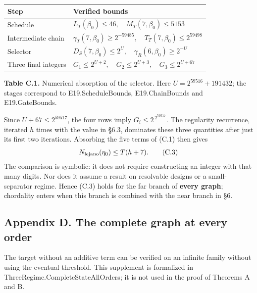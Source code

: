 \documentclass[english,11pt,a4paper]{article}
\newcounter{none}
\begin{document}

{\def\LTcaptype{none} %
\begin{longtable}[c]{@{}
  >{\raggedright\arraybackslash}p{}
  >{\raggedright\arraybackslash}p{}@{}}
\toprule\noalign{}
\begin{minipage}[b]{\linewidth}\raggedright
Step
\end{minipage} & \begin{minipage}[b]{\linewidth}\raggedright
Verified bounds
\end{minipage} \\
\midrule\noalign{}
\endhead
\bottomrule\noalign{}
\endlastfoot
Schedule & \(L_T(\beta_0)\le46,\quad M_T(7,\beta_0)\le5153\) \\
Intermediate chain & \(\gamma_T(7,\beta_0)\ge2^{-59485},\quad T_T(7,\beta_0)\le2^{59498}\) \\
Selector & \(D_S(7,\beta_0)\le2^U,\quad \gamma_R(6,\beta_0)\ge2^{-U}\) \\
Three final integers & \(G_1\le2^{U+2},\quad G_2\le2^{U+3},\quad G_3\le2^{U+67}\) \\
\end{longtable}
}

\textbf{Table C.1.} Numerical absorption of the selector. Here \(U=2^{59516}+191432\); the stages correspond to E19.ScheduleBounds, E19.ChainBounds and E19.GateBounds.

Since \(U+67\le2^{59517}\), the four rows imply \(G_i\le2^{\,2^{59517}}\). The regularity recurrence, iterated \(h\) times with the value in §6.3, dominates these three quantities after just its first two iterations. Absorbing the five terms of (C.1) then gives \[
N_{\rm lejano}(\eta_0)\le T(h+7).
\tag{C.3}
\] The comparison is symbolic: it does not require constructing an integer with that many digits. Nor does it assume a result on resolvable designs or a small-separator regime. Hence (C.3) holds for the far branch of \textbf{every graph}; chordality enters when this branch is combined with the near branch in §6.

\subsection{Appendix D. The complete graph at every order}\label{appendix-d.-the-complete-graph-at-every-order}

The target without an additive term can be verified on an infinite family without using the eventual threshold. This supplement is formalized in {\ttfamily\small ThreeRegime.\discretionary{\hbox{\ensuremath{\hookrightarrow}}}{}{}CompleteStat\discretionary{\hbox{\ensuremath{\hookrightarrow}}}{}{}eAllOrders}; it is not used in the proof of Theorems A and B.
\end{document}
